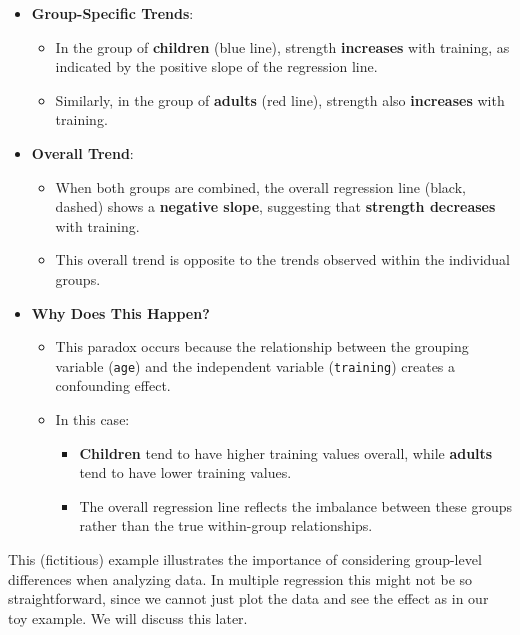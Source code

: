 \documentclass[
]{book}
\providecommand{\tightlist}{%
  \setlength{\itemsep}{0pt}\setlength{\parskip}{0pt}}
\begin{document}
\begin{itemize}
\tightlist
\item
  \textbf{Group-Specific Trends}:

  \begin{itemize}
  \tightlist
  \item
    In the group of \textbf{children} (blue line), strength \textbf{increases} with training, as indicated by the positive slope of the regression line.
  \item
    Similarly, in the group of \textbf{adults} (red line), strength also \textbf{increases} with training.
  \end{itemize}
\item
  \textbf{Overall Trend}:

  \begin{itemize}
  \tightlist
  \item
    When both groups are combined, the overall regression line (black, dashed) shows a \textbf{negative slope}, suggesting that \textbf{strength decreases} with training.
  \item
    This overall trend is opposite to the trends observed within the individual groups.
  \end{itemize}
\item
  \textbf{Why Does This Happen?}

  \begin{itemize}
  \tightlist
  \item
    This paradox occurs because the relationship between the grouping variable (\texttt{age}) and the independent variable (\texttt{training}) creates a confounding effect.
  \item
    In this case:

    \begin{itemize}
    \tightlist
    \item
      \textbf{Children} tend to have higher training values overall, while \textbf{adults} tend to have lower training values.
    \item
      The overall regression line reflects the imbalance between these groups rather than the true within-group relationships.
    \end{itemize}
  \end{itemize}
\end{itemize}

This (fictitious) example illustrates the importance of considering group-level differences when analyzing data.
In multiple regression this might not be so straightforward, since we cannot just plot the data and see the effect
as in our toy example. We will discuss this later.
\end{document}
